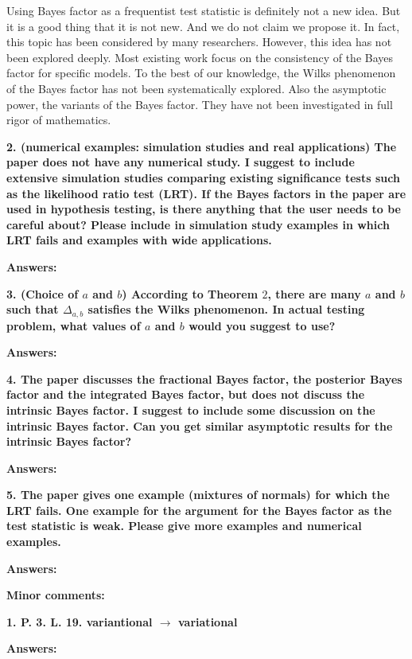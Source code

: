 \documentclass[11pt]{article}
\theoremstyle{plain}
\theoremstyle{definition}
\theoremstyle{remark}
\begin{document}
Using Bayes factor as a frequentist test statistic is definitely not a new idea.
But it is a good thing that it is not new.
And we do not claim we propose it.
In fact, this topic has been considered by many researchers.
However, this idea has not been explored deeply.
Most existing work focus on the consistency of the Bayes factor for specific models.
To the best of our knowledge, the Wilks phenomenon of the Bayes factor has not been systematically explored.
Also the asymptotic power, the variants of the Bayes factor.
They have not been investigated in full rigor of mathematics.

\textbf{
    2.
    (numerical examples: simulation studies and real applications) The paper does not have any numerical study. I suggest to include extensive simulation studies comparing existing significance tests such as the likelihood ratio test (LRT). If the Bayes factors in the paper are used in hypothesis testing, is there anything that the user needs to be careful about? Please include in simulation study examples in which LRT fails and examples with wide applications.
}


\textbf{Answers:}


\textbf{
    3. (Choice of $a$ and $b$) According to Theorem $2$, there are many $a$ and $b$ such that $\Delta_{a,b}$ satisfies the Wilks phenomenon.
    In actual testing problem, what values of $a$ and $b$ would you suggest to use?
}

\textbf{Answers:}





\textbf{
    4. The paper discusses the fractional Bayes factor, the posterior Bayes factor and the integrated Bayes factor, but does not discuss the intrinsic Bayes factor. I suggest to include some discussion on the intrinsic Bayes factor. Can you get similar asymptotic results for the intrinsic Bayes factor?
}

\textbf{Answers:}


\textbf{
    5. The paper gives one example (mixtures of normals) for which the LRT fails. One example for the argument for the Bayes factor as the test statistic is weak. Please give more examples and numerical examples.
}

\textbf{Answers:}


\textbf{Minor comments:}

\textbf{
1. 
P. 3. L. 19. variantional $\rightarrow$ variational
}

\textbf{Answers:}
\end{document}
